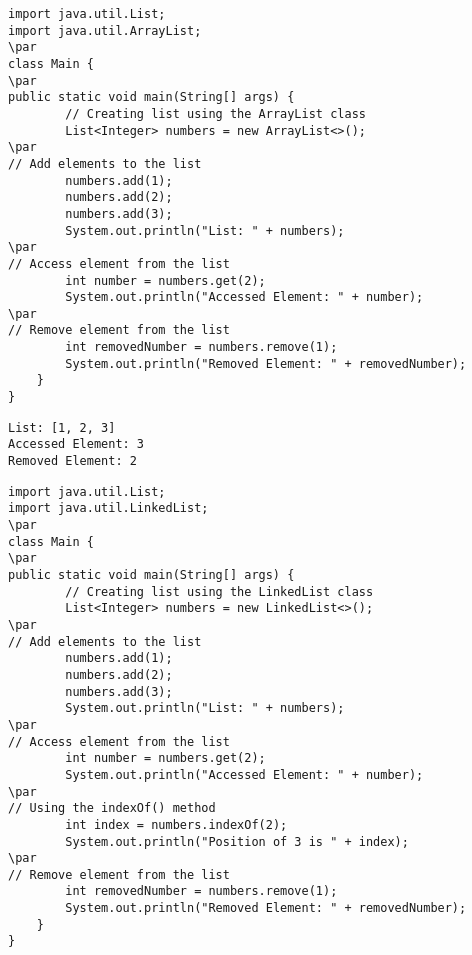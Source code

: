 \documentclass{book}
\def\lthtmlcheckvsize{\ifdim\ht\sizebox<\vsize 
  \ifdim\wd\sizebox<\hsize\expandafter\hfill\fi \expandafter\vfill
  \else\expandafter\vss\fi}%
\begin{document}
{\newpage\clearpage
{}%
\begin{lstlisting}
import java.util.List;
import java.util.ArrayList;
\par
class Main {
\par
public static void main(String[] args) {
        // Creating list using the ArrayList class
        List<Integer> numbers = new ArrayList<>();
\par
// Add elements to the list
        numbers.add(1);
        numbers.add(2);
        numbers.add(3);
        System.out.println("List: " + numbers);
\par
// Access element from the list
        int number = numbers.get(2);
        System.out.println("Accessed Element: " + number);
\par
// Remove element from the list
        int removedNumber = numbers.remove(1);
        System.out.println("Removed Element: " + removedNumber);
    }
}
\end{lstlisting}%
\lthtmlfigureZ
\lthtmlcheckvsize\clearpage}

{\newpage\clearpage
{}%
\begin{lstlisting}
List: [1, 2, 3]
Accessed Element: 3
Removed Element: 2
\end{lstlisting}%
\lthtmlfigureZ
\lthtmlcheckvsize\clearpage}

{\newpage\clearpage
{}%
\begin{lstlisting}
import java.util.List;
import java.util.LinkedList;
\par
class Main {
\par
public static void main(String[] args) {
        // Creating list using the LinkedList class
        List<Integer> numbers = new LinkedList<>();
\par
// Add elements to the list
        numbers.add(1);
        numbers.add(2);
        numbers.add(3);
        System.out.println("List: " + numbers);
\par
// Access element from the list
        int number = numbers.get(2);
        System.out.println("Accessed Element: " + number);
\par
// Using the indexOf() method
        int index = numbers.indexOf(2);
        System.out.println("Position of 3 is " + index);
\par
// Remove element from the list
        int removedNumber = numbers.remove(1);
        System.out.println("Removed Element: " + removedNumber);
    }
}
\end{lstlisting}%
\lthtmlfigureZ
\lthtmlcheckvsize\clearpage}
\end{document}
